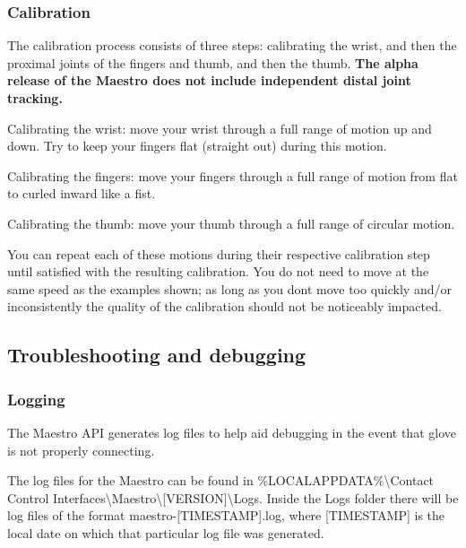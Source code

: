 \label{_calibrationHeader}%


\subsubsection*{Calibration}

The calibration process consists of three steps\+: calibrating the wrist, and then the proximal joints of the fingers and thumb, and then the thumb. {\bfseries The alpha release of the Maestro does not include independent distal joint tracking.}


\begin{DoxyEnumerate}
\item Calibrating the wrist\+: move your wrist through a full range of motion up and down. Try to keep your fingers flat (straight out) during this motion. 
\item Calibrating the fingers\+: move your fingers through a full range of motion from flat to curled inward like a fist. 
\item Calibrating the thumb\+: move your thumb through a full range of circular motion. 
\end{DoxyEnumerate}

You can repeat each of these motions during their respective calibration step until satisfied with the resulting calibration. You do not need to move at the same speed as the examples shown; as long as you don\textquotesingle{}t move too quickly and/or inconsistently the quality of the calibration should not be noticeably impacted.

\subsection*{Troubleshooting and debugging}

\subsubsection*{Logging}

The Maestro A\+PI generates log files to help aid debugging in the event that glove is not properly connecting.

The log files for the Maestro can be found in {\ttfamily \%L\+O\+C\+A\+L\+A\+P\+P\+D\+A\+TA\%\textbackslash{}Contact Control Interfaces\textbackslash{}Maestro\textbackslash{}\mbox{[}V\+E\+R\+S\+I\+ON\mbox{]}\textbackslash{}Logs}. Inside the {\ttfamily Logs} folder there will be log files of the format {\ttfamily maestro-\/\mbox{[}T\+I\+M\+E\+S\+T\+A\+MP\mbox{]}.log}, where {\ttfamily \mbox{[}T\+I\+M\+E\+S\+T\+A\+MP\mbox{]}} is the local date on which that particular log file was generated.

